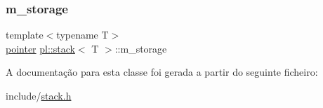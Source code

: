 \mbox{\label{classpl_1_1stack_a65f803f7a3ddb160cf77ed0d53d514cd}} 
\subsubsection{\texorpdfstring{m\+\_\+storage}{m\_storage}}
{\footnotesize\ttfamily template$<$typename T$>$ \\
\hyperlink{classpl_1_1stack_a3713c8d6cb6cc72c07a445b11c39ae43}{pointer} \hyperlink{classpl_1_1stack}{pl\+::stack}$<$ T $>$\+::m\+\_\+storage\hspace{0.3cm}{\ttfamily [private]}}



A documentação para esta classe foi gerada a partir do seguinte ficheiro\+:\begin{DoxyCompactItemize}
\item 
include/\hyperlink{stack_8h}{stack.\+h}\end{DoxyCompactItemize}
